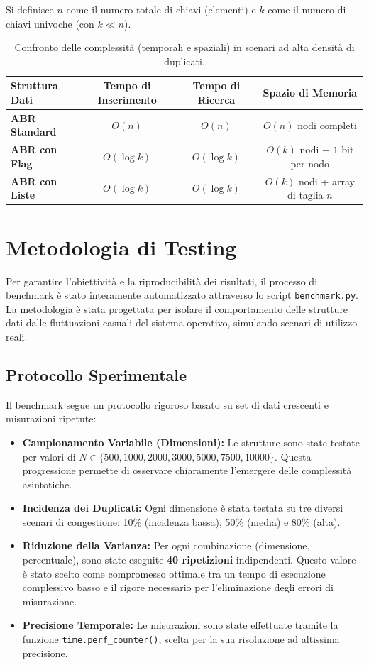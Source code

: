 \documentclass[11pt,a4paper]{article}
\begin{document}
Si definisce $n$ come il numero totale di chiavi (elementi) e $k$ come il numero di chiavi univoche (con $k \ll n$).

\begin{table}[h]
\centering
\renewcommand{\arraystretch}{1.5} %
\begin{tabular}{|l|c|c|c|}
\hline
\textbf{Struttura Dati} & \textbf{Tempo di Inserimento} & \textbf{Tempo di Ricerca} & \textbf{Spazio di Memoria} \\
\hline
\textbf{ABR Standard} & $O(n)$ & $O(n)$ & $O(n)$ nodi completi \\
\textbf{ABR con Flag} & $O(\log k)$ & $O(\log k)$ & $O(k)$ nodi + $1$ bit per nodo \\
\textbf{ABR con Liste} & $O(\log k)$ & $O(\log k)$ & $O(k)$ nodi + array di taglia $n$ \\
\hline
\end{tabular}
\caption{Confronto delle complessità (temporali e spaziali) in scenari ad alta densità di duplicati.}
\label{tab:complessita}
\end{table}

\section{Metodologia di Testing}

Per garantire l'obiettività e la riproducibilità dei risultati, il processo di benchmark è stato interamente automatizzato attraverso lo script \texttt{benchmark.py}. La metodologia è stata progettata per isolare il comportamento delle strutture dati dalle fluttuazioni casuali del sistema operativo, simulando scenari di utilizzo reali.

\subsection{Protocollo Sperimentale}

Il benchmark segue un protocollo rigoroso basato su set di dati crescenti e misurazioni ripetute:
\begin{itemize}
    \item \textbf{Campionamento Variabile (Dimensioni):} Le strutture sono state testate per valori di $N \in \{500, 1000, 2000, 3000, 5000, 7500, 10000\}$. Questa progressione permette di osservare chiaramente l'emergere delle complessità asintotiche.
    \item \textbf{Incidenza dei Duplicati:} Ogni dimensione è stata testata su tre diversi scenari di congestione: 10\% (incidenza bassa), 50\% (media) e 80\% (alta).
    \item \textbf{Riduzione della Varianza:} Per ogni combinazione (dimensione, percentuale), sono state eseguite \textbf{40 ripetizioni} indipendenti. Questo valore è stato scelto come compromesso ottimale tra un tempo di esecuzione complessivo basso e il rigore necessario per l'eliminazione degli errori di misurazione. 
    \item \textbf{Precisione Temporale:} Le misurazioni sono state effettuate tramite la funzione \texttt{time.perf\_counter()}, scelta per la sua risoluzione ad altissima precisione.
\end{itemize}
\end{document}
